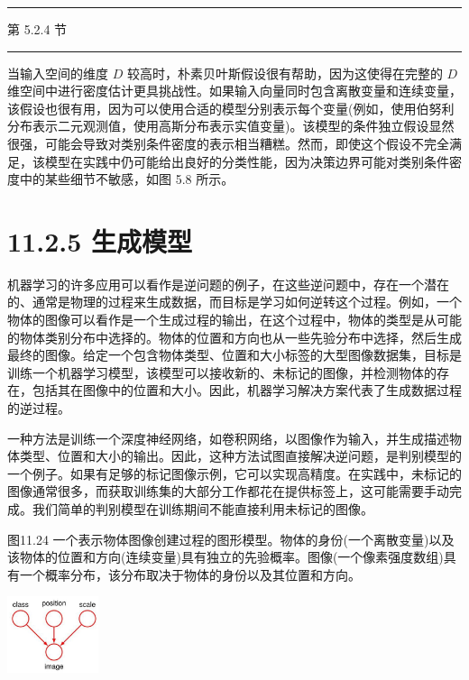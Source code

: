 \documentclass[10pt]{report}
\newcommand{\HRule}{\begin{center}\rule{0.9\linewidth}{0.2mm}\end{center}}
\begin{document}
\HRule

第 5.2.4 节

\HRule

当输入空间的维度 \(D\) 较高时，朴素贝叶斯假设很有帮助，因为这使得在完整的 \(D\) 维空间中进行密度估计更具挑战性。如果输入向量同时包含离散变量和连续变量，该假设也很有用，因为可以使用合适的模型分别表示每个变量(例如，使用伯努利分布表示二元观测值，使用高斯分布表示实值变量)。该模型的条件独立假设显然很强，可能会导致对类别条件密度的表示相当糟糕。然而，即使这个假设不完全满足，该模型在实践中仍可能给出良好的分类性能，因为决策边界可能对类别条件密度中的某些细节不敏感，如图 5.8 所示。

\section*{11.2.5 生成模型}

机器学习的许多应用可以看作是逆问题的例子，在这些逆问题中，存在一个潜在的、通常是物理的过程来生成数据，而目标是学习如何逆转这个过程。例如，一个物体的图像可以看作是一个生成过程的输出，在这个过程中，物体的类型是从可能的物体类别分布中选择的。物体的位置和方向也从一些先验分布中选择，然后生成最终的图像。给定一个包含物体类型、位置和大小标签的大型图像数据集，目标是训练一个机器学习模型，该模型可以接收新的、未标记的图像，并检测物体的存在，包括其在图像中的位置和大小。因此，机器学习解决方案代表了生成数据过程的逆过程。

一种方法是训练一个深度神经网络，如卷积网络，以图像作为输入，并生成描述物体类型、位置和大小的输出。因此，这种方法试图直接解决逆问题，是判别模型的一个例子。如果有足够的标记图像示例，它可以实现高精度。在实践中，未标记的图像通常很多，而获取训练集的大部分工作都花在提供标签上，这可能需要手动完成。我们简单的判别模型在训练期间不能直接利用未标记的图像。

图11.24 一个表示物体图像创建过程的图形模型。物体的身份(一个离散变量)以及该物体的位置和方向(连续变量)具有独立的先验概率。图像(一个像素强度数组)具有一个概率分布，该分布取决于物体的身份以及其位置和方向。

\begin{center}
\includegraphics[max width=0.2\textwidth]{images/0194e279-9b28-703a-88f4-c3ac21e2010d_366_1191_351_354_298_0.jpg}
\end{center}
\hspace*{3em} 
\end{document}
